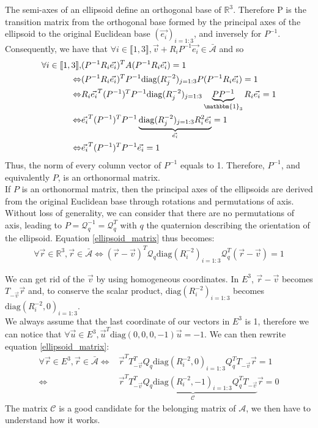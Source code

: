 \documentclass[class=report, float=false, crop=false]{standalone}
\begin{document}
The semi-axes of an ellipsoid define an orthogonal base of $\mathbb{R}^3$. Therefore P is the transition matrix from the orthogonal base formed by the principal axes of the ellipsoid to the original Euclidean base $(\vec{e_i})_{i=1:3}$, and inversely for $P^{-1}$.\\

Consequently, we have that $\forall i \in \llbracket1,3\rrbracket, \vec{v} + R_iP^{-1}\vec{e_i} \in \bar{\mathcal{A}}$ and so
\begin{align*}
\forall i \in \llbracket1,3\rrbracket,&(P^{-1}R_i\vec{e_i})^TA(P^{-1}R_i\vec{e_i}) = 1\\ \Leftrightarrow&(P^{-1}R_i\vec{e_i})^TP^{-1}\text{diag}(R_j^{-2})_{j=1:3}P(P^{-1}R_i\vec{e_i}) = 1\\
\Leftrightarrow &R_i\vec{e_i}^T(P^{-1})^TP^{-1}\text{diag}(R_j^{-2})_{j=1:3}\underbrace{PP^{-1}}_{\mathbbm{1}_3}R_i\vec{e_i} = 1\\
\Leftrightarrow &\vec{e_i}^T(P^{-1})^TP^{-1}\underbrace{\text{diag}(R_j^{-2})_{j=1:3}R_i^2\vec{e_i}}_{\vec{e_i}} = 1\\
\Leftrightarrow &\vec{e_i}^T(P^{-1})^TP^{-1}\vec{e_i} = 1
\end{align*}
Thus, the norm of every column vector of $P^{-1}$ equals to 1. Therefore, $P^{-1}$, and equivalently $P$, is an orthonormal matrix.\\

If $P$ is an orthonormal matrix, then the principal axes of the ellipsoids are derived from the original Euclidean base through rotations and permutations of axis. Without loss of generality, we can consider that there are no permutations of axis, leading to $P = \mathcal{Q}_q^{-1} = \mathcal{Q}_q^T$ with $q$ the quaternion describing the orientation of the ellipsoid. Equation \ref{ellipsoid_matrix} thus becomes:
\begin{align*}
\forall \vec{r} \in \mathbb{R}^3, \vec{r} \in \bar{\mathcal{A}} \Leftrightarrow (\vec{r}-\vec{v})^T\mathcal{Q}_q\text{diag}(R_i^{-2})_{i=1:3}\mathcal{Q}_q^T(\vec{r}-\vec{v}) = 1
\end{align*}

We can get rid of the $\vec{v}$ by using homogeneous coordinates. In $E^3$, $\vec{r} - \vec{v}$ becomes $T_{-\vec{v}}\vec{r}$ and, to conserve the scalar product, $\text{diag}(R_i^{-2})_{i=1:3}$ becomes $\text{diag}(R_i^{-2},0)_{i=1:3}$.\\

We always assume that the last coordinate of our vectors in $E^3$ is 1, therefore we can notice that $\forall \vec{u} \in E^3, \vec{u}^T\text{diag}(0,0,0,-1)\vec{u} = -1$. We can then rewrite equation \ref{ellipsoid_matrix}:
\begin{align*}
\forall \vec{r} \in E^3, \vec{r} \in \bar{\mathcal{A}} \Leftrightarrow &\vec{r}^TT_{-\vec{v}}^TQ_q\text{diag}(R_i^{-2},0)_{i=1:3}Q_q^TT_{-\vec{v}}\vec{r} = 1\\
\Leftrightarrow&\vec{r}^T\underbrace{T_{-\vec{v}}^TQ_q\text{diag}(R_i^{-2},-1)_{i=1:3}Q_q^TT_{-\vec{v}}}_{\mathcal{C}}\vec{r} = 0
\end{align*}
The matrix $\mathcal{C}$ is a good candidate for the belonging matrix of $\mathcal{A}$, we then have to understand how it works.\\
\end{document}

